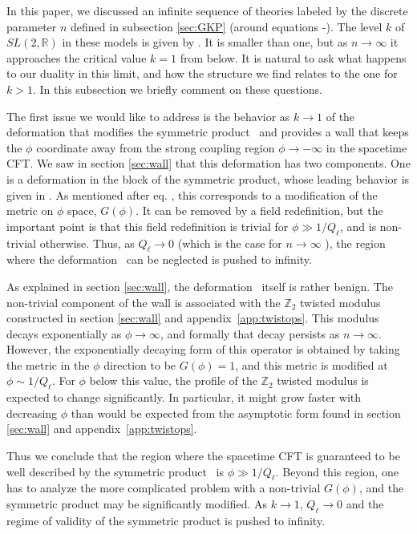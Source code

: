 \documentclass[12pt]{article}
\newcommand{\bR}{{\mathbb R}}
\newcommand{\bZ}{{\mathbb Z}}
\numberwithin{equation}{section}
\begin{document}

\label{sec:ktheory}

In this paper, we discussed an infinite sequence of theories labeled by the discrete parameter $n$ defined in subsection \ref{sec:GKP} (around equations \cccnnn-\twodlst). The level $k$ of $SL(2,\bR)$ in these models is given by \kntwod. It is smaller than one, but as $n\to\infty$ it approaches the critical value $k=1$ from below. It is natural to ask what happens to our duality in this limit, and how the structure we find relates to the one for $k>1$. In this subsection we briefly comment on these questions. 

The first issue we would like to address is the behavior as $k\to 1$ of the deformation that modifies the symmetric product \ourcft\ and provides a wall that keeps the $\phi$ coordinate away from the strong coupling region $\phi\to-\infty$ in the spacetime CFT. We saw in section \ref{sec:wall} that this deformation has two components. One is a deformation in the block of the symmetric product, whose leading behavior is given in \Lblock. As mentioned after eq. \phiredef, this corresponds to a modification of the metric on $\phi$ space, $G(\phi)$. It can be removed by a field redefinition, but the important point is that this field redefinition is trivial for $\phi\gg 1/Q_\ell$, and is non-trivial otherwise. Thus, as $Q_\ell\to 0$ (which is the case for $n\to\infty$ \longss), the region where the deformation \Lblock\ can be neglected is pushed to infinity. 

As explained in section \ref{sec:wall}, the deformation \Lblock\ itself is rather benign. The non-trivial component of the wall is associated with the $\bZ_2$ twisted modulus constructed in section \ref{sec:wall} and appendix~\ref{app:twistops}. This modulus decays exponentially as $\phi\to\infty$, and formally that decay persists as $n\to\infty$. However, the exponentially decaying form of this operator is obtained by taking the metric in the $\phi$ direction to be $G(\phi)=1$, and this metric is modified at $\phi\sim 1/Q_\ell$. For $\phi$ below this value, the profile of the $\bZ_2$ twisted modulus is expected to change significantly. In particular, it might grow faster with decreasing $\phi$ than would be expected from the asymptotic form found in section \ref{sec:wall} and appendix~\ref{app:twistops}.

Thus we conclude that the region where the spacetime CFT is guaranteed to be well described by the symmetric product \ourcft\ is $\phi\gg 1/Q_\ell$. Beyond this region, one has to analyze the more complicated problem with a non-trivial $G(\phi)$, and the symmetric product may be significantly modified. As $k\to 1$, $Q_\ell\to 0$ and the regime of validity of the symmetric product is pushed to infinity. 
\end{document}
